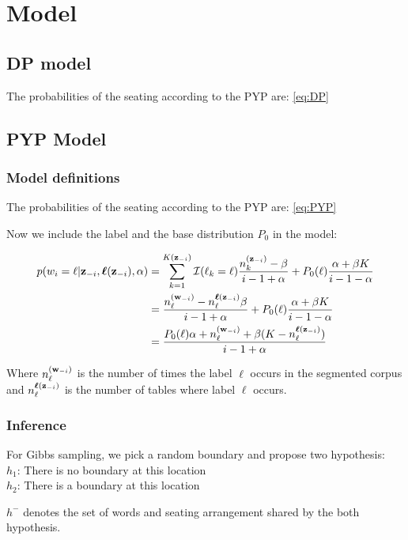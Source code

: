 \section{Model}

\subsection{DP model}

The probabilities of the seating according to the PYP are: \eqref{eq:DP}
\subsection{PYP Model}
\subsubsection{Model definitions}

The probabilities of the seating according to the PYP are: \eqref{eq:PYP}

Now we include the label and the base distribution $P_0$ in the model:

\begin{align}
p(w_i=\ell|\bm{\mathbf{z}}_{-i},\bm{\mathbf{\ell}}(\bm{\mathbf{z}}_{-i}),\alpha) &= \sum_{k=1}^{K(\bm{\mathbf{z}}_{-i})}\mathcal{I}(\ell_k=\ell)\dfrac{n_k^{(\bm{\mathbf{z}}_{-i})}-\beta}{i - 1 + \alpha} + P_0(\ell)\dfrac{\alpha + \beta K}{i -1 -\alpha} \\
&= \dfrac{n_{\ell}^{(\bm{\mathbf{w}}_{-i})}- n_{\ell}^{\bm{\mathbf{\ell}}(\bm{\mathbf{z}}_{-i})}\beta}{i - 1 + \alpha} + P_0(\ell)\dfrac{\alpha + \beta K}{i -1 -\alpha} \\
&= \dfrac{P_0(\ell)\alpha + n_{\ell}^{(\bm{\mathbf{w}}_{-i})}+ \beta (K - n_{\ell}^{\bm{\mathbf{\ell}}(\bm{\mathbf{z}}_{-i})})}{i - 1 + \alpha} 
\end{align}

Where $n_{\ell}^{(\bm{\mathbf{w}}_{-i})}$ is the number of times the label $\ell$ occurs in the segmented corpus and $n_{\ell}^{\bm{\mathbf{\ell}}(\bm{\mathbf{z}}_{-i})}$ is the number of tables where label $\ell$ occurs.

\subsubsection{Inference}

For Gibbs sampling, we pick a random boundary and propose two hypothesis:
\\
$h_1$: There is no boundary at this location \\
$h_2$: There is a boundary at this location


$h^-$ denotes the set of words and seating arrangement shared by the both hypothesis.

